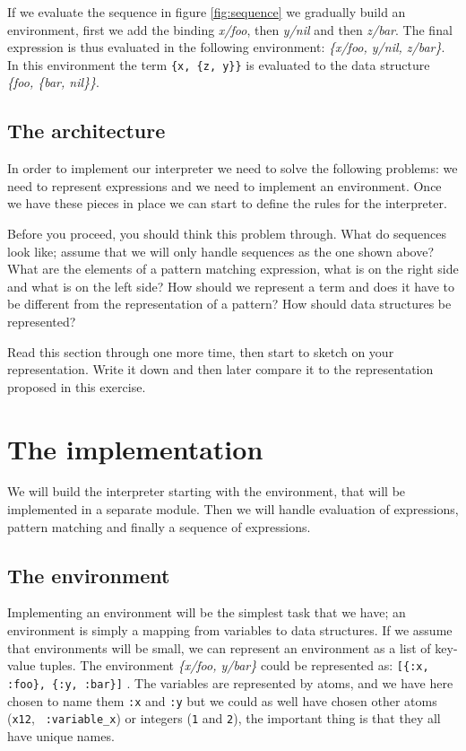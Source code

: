 \documentclass[a4paper,11pt]{article}
\begin{document}
If we evaluate the sequence in figure \ref{fig:sequence} we gradually
build an environment, first we add the binding {\em x/foo}, then {\em
  y/nil} and then {\em z/bar}. The final expression is thus evaluated
in the following environment: {\em \{x/foo, y/nil, z/bar\}}. In this
environment the term \verb+{x, {z, y}}+ is evaluated to the data
structure {\em \{foo, \{bar, nil\}\}}.

\subsection{The architecture}
In order to implement our interpreter we need to solve the following
problems: we need to represent expressions and we need to implement an
environment. Once we have these pieces in place we can start to define
the rules for the interpreter.

Before you proceed, you should think this problem through. What do
sequences look like; assume that we will only handle sequences as the
one shown above? What are the elements of a pattern
matching expression, what is on the right side and what is on the left
side? How should we represent a term and does it have to be different
from the representation of a pattern? How should data structures be
represented?

Read this section through one more time, then start to sketch on your
representation. Write it down and then later compare it to the
representation proposed in this exercise. 


\section{The implementation}

We will build the interpreter starting with the environment, that will
be implemented in a separate module. Then we will handle evaluation
of expressions, pattern matching and finally a sequence of
expressions.

\subsection{The environment}
Implementing an environment will be the simplest task that we have; an
environment is simply a mapping from variables to data structures. If
we assume that environments will be small, we can represent an
environment as a list of key-value tuples. The environment {\em
  \{x/foo, y/bar\}} could be represented as:
\verb+[{:x, :foo}, {:y, :bar}]+ . The variables are represented by
atoms, and we have here chosen to name them {\tt :x} and {\tt :y} but
we could as well have chosen other atoms ({\tt x12}, {\tt
  :variable\_x}) or integers ({\tt 1} and {\tt 2}), the important
thing is that they all have unique names.
\end{document}
